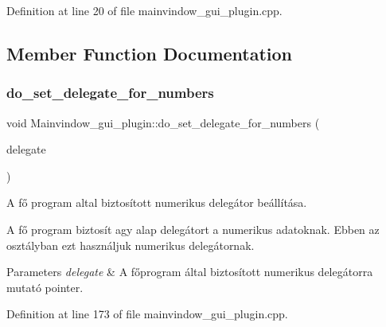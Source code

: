 Definition at line 20 of file mainvindow\+\_\+gui\+\_\+plugin.\+cpp.



\subsection{Member Function Documentation}
\mbox{\label{classMainvindow__gui__plugin_aaf24d376b70a136b52e8dae5dfc3ad15}} 
\subsubsection{\texorpdfstring{do\+\_\+set\+\_\+delegate\+\_\+for\+\_\+numbers}{do\_set\_delegate\_for\_numbers}}
{\footnotesize\ttfamily void Mainvindow\+\_\+gui\+\_\+plugin\+::do\+\_\+set\+\_\+delegate\+\_\+for\+\_\+numbers (\begin{DoxyParamCaption}\item[{Q\+Styled\+Item\+Delegate $\ast$}]{delegate }\end{DoxyParamCaption})\hspace{0.3cm}{\ttfamily [slot]}}



A fő program altal biztosított numerikus delegátor beállítása. 

A fő program biztosít agy alap delegátort a numerikus adatoknak. Ebben az osztályban ezt használjuk numerikus delegátornak.


\begin{DoxyParams}{Parameters}
{\em delegate} & A főprogram által biztosított numerikus delegátorra mutató pointer. \\
\hline
\end{DoxyParams}


Definition at line 173 of file mainvindow\+\_\+gui\+\_\+plugin.\+cpp.

\mbox{\label{classMainvindow__gui__plugin_a4be633148117ee9541d59733cd591dd7}} 
